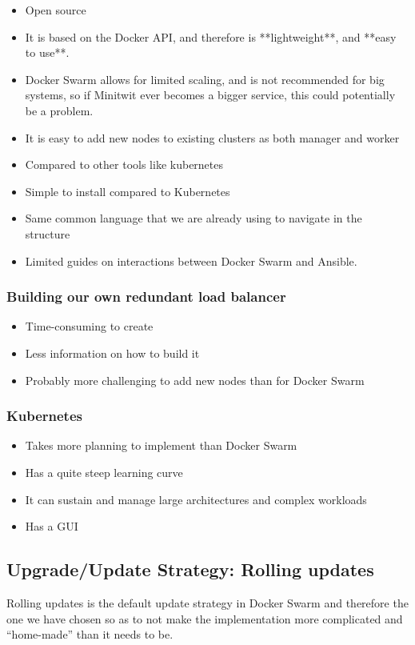 \cite{ansible:dockerswarm}
\begin{itemize}
    \item Open source
    \item It is based on the Docker API, and therefore is **lightweight**, and **easy to use**.
    \item Docker Swarm allows for limited scaling, and is not recommended for big systems, so if Minitwit ever becomes a bigger service, this could potentially be a problem.
    \item It is easy to add new nodes to existing clusters as both manager and worker
    \item Compared to other tools like kubernetes
    \item Simple to install compared to Kubernetes
    \item Same common language that we are already using to navigate in the structure
    \item Limited guides on interactions between Docker Swarm and Ansible.
\end{itemize}

\subsubsection{Building our own redundant load balancer}
\begin{itemize}
    \item Time-consuming to create
    \item Less information on how to build it
    \item Probably more challenging to add new nodes than for Docker Swarm
\end{itemize}

\subsubsection{Kubernetes}
\begin{itemize}
    \item Takes more planning to implement than Docker Swarm
    \item Has a quite steep learning curve
    \item It can sustain and manage large architectures and complex workloads
    \item Has a GUI
\end{itemize}

\subsection{Upgrade/Update Strategy: Rolling updates}

Rolling updates is the default update strategy in Docker Swarm and therefore the one we have chosen so as to not make the implementation more complicated and “home-made” than it needs to be.
